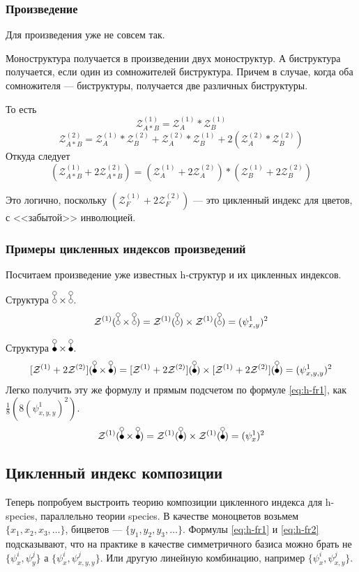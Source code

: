 \subsubsection{Произведение}
Для произведения уже не совсем так. 
\begin{statement}
Моноструктура получается
в произведении двух моноструктур. А биструктура получается, если один из
сомножителей биструктура. Причем в случае, когда оба сомножителя ---
биструктуры, получается две различных биструктуры. 
\end{statement}
То есть
$$
\mathcal Z_{A * B}^{(1)} = \mathcal Z_A^{(1)} * \mathcal Z_B^{(1)}
$$
$$
\mathcal Z_{A * B}^{(2)} = 
\mathcal Z_A^{(1)} * \mathcal Z_B^{(2)} + 
\mathcal Z_A^{(2)} * \mathcal Z_B^{(1)} +
2 (\mathcal Z_A^{(2)} * \mathcal Z_B^{(2)})
$$
Откуда следует
$$
(\mathcal Z_{A * B}^{(1)} + 2\mathcal Z_{A * B}^{(2)}) = 
(\mathcal Z_A^{(1)} + 2\mathcal Z_A^{(2)}) * 
(\mathcal Z_B^{(1)} + 2\mathcal Z_B^{(2)})
$$

\begin{remark}
Это логично, поскольку $(\mathcal Z_F^{(1)} + 2\mathcal Z_F^{(2)})$ --- это
цикленный индекс для цветов, с <<забытой>> инволюцией.
\end{remark}

\subsubsection{Примеры цикленных индексов произведений}
Посчитаем произведение уже известных h-структур и их цикленных индексов.

\begin{example}
Структура $\dA \times \dA$.
$$
\mathcal Z^{(1)}(\dA \times \dA) = \mathcal Z^{(1)}(\dA) \times \mathcal
Z^{(1)}(\dA) = (\psi_{x, y}^1)^2
$$
\end{example}
\begin{example}
Структура $\dB \times \dB$.
$$
\Zfull(\dB \times \dB) = \Zfull(\dB) \times \Zfull(\dB) =(\psi_{x, y, y}^1)^2
$$
Легко получить эту же формулу и прямым подсчетом по формуле \ref{eq:h-fr1}, как
$\frac{1}{8}(8(\psi_{x, y, y}^1)^2)$.
$$
\mathcal Z^{(1)}(\dB \times \dB) = \mathcal Z^{(1)}(\dB) \times \mathcal
Z^{(1)}(\dB) =(\psi_{x}^1)^2
$$
\end{example}

\subsection{Цикленный индекс композиции}
Теперь попробуем выстроить теорию композиции цикленного индекса для h-species,
параллельно теории species. В качестве моноцветов возьмем $\{x_1, x_2, x_3,
\dots\}$, бицветов --- $\{y_1, y_2, y_3, \dots\}$. Формулы \ref{eq:h-fr1} и
\ref{eq:h-fr2} подсказывают, что на практике в качестве симметричного базиса
можно брать не $\{\psi_x^i, \psi_y^j\}$ а $\{\psi_x^i, \psi_{x,y,y}^j\}$. Или
другую линейную комбинацию, например $\{\psi_x^i, \psi_{x,y}^j\}$.

